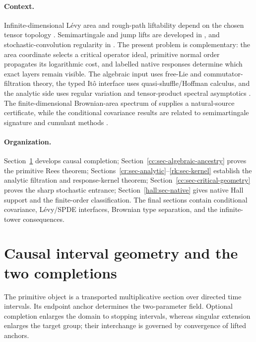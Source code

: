 \documentclass[10pt,reqno]{amsart}
\theoremstyle{plain}
\theoremstyle{definition}
\theoremstyle{remark}
\begin{document}
\paragraph{Context.}
Infinite-dimensional L\'evy area and rough-path liftability depend on the
chosen tensor topology
\cite{LedouxLyonsQian02,Dereich10,GarridoLuSchmalfuss15,GrongNilssenSchmeding22,Kalinichenko25}.
Semimartingale and jump lifts are developed in
\cite{Chevyrev18,FrizShekhar17,ChevyrevFriz19,ChevyrevFerrucci26}, and
stochastic-convolution regularity in
\cite{DaPratoKwapienZabczyk87,Brzezniak97,DaPratoZabczyk14,GubinelliTindel10}.
The present problem is complementary: the area coordinate selects a critical
operator ideal, primitive normal order propagates its logarithmic cost, and
labelled native responses determine which exact layers remain visible.  The
algebraic input uses free-Lie and commutator-filtration theory, the typed It\^o
interface uses quasi-shuffle/Hoffman calculus, and the analytic side uses
regular variation and tensor-product spectral asymptotics
\cite{Reutenauer93,Kapranov98,Hoffman00,CurryEtAl14,BGT87,KarolNazarovNikitin08,Rastegaev18}.
The finite-dimensional Brownian-area spectrum of
\cite{DelaCruzOberhauser26} supplies a natural-source certificate, while the
conditional covariance results are related to semimartingale signature and
cumulant methods \cite{FrizHagerTapia24}.

\paragraph{Organization.}
Section~\ref{cc:sec-causal-completions} develops causal completion;
Section~\ref{cc:sec-algebraic-ancestry} proves the primitive Rees theorem;
Sections~\ref{cr:sec-analytic}--\ref{rk:sec-kernel} establish the analytic
filtration and response-kernel theorem; Section~\ref{cc:sec-critical-geometry}
proves the sharp stochastic entrance; Section~\ref{hall:sec-native} gives
native Hall support and the finite-order classification.  The final sections
contain conditional covariance, L\'evy/SPDE interfaces, Brownian type
separation, and the infinite-tower consequences.
\section{Causal interval geometry and the two completions}
\label{cc:sec-causal-completions}

The primitive object is a transported multiplicative section over directed
time intervals.  Its endpoint anchor determines the two-parameter field.
Optional completion enlarges the domain to stopping intervals, whereas
singular extension enlarges the target group; their interchange is governed
by convergence of lifted anchors.
\end{document}
